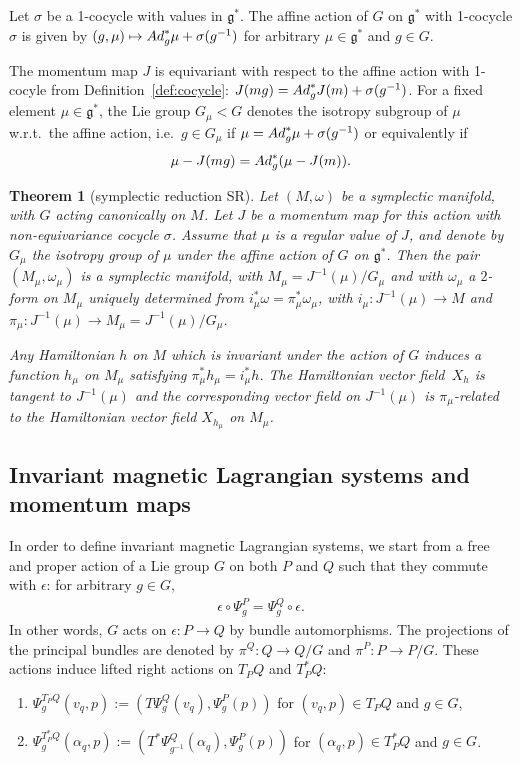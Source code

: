 \documentclass[11pt]{article}
\newtheorem{theorem}{Theorem}
\newcommand{\e}{\epsilon}
\newcommand{\lag}{\mathfrak{g}}
\begin{document}
\begin{definition} Let $\sigma$ be a 1-cocycle with values in $\lag^*$. The af\/f\/ine action of $G$ on $\lag^*$ with 1-cocycle $\sigma$ is given by $(g,\mu)\mapsto {\rm Ad}^*_{g}\mu +\sigma(g^{-1})$ for arbitrary $\mu\in\lag^*$ and $g\in G$.
\end{definition}
The momentum map $J$ is equivariant with respect to the af\/f\/ine action with 1-cocyle from Definition~\ref{def:cocycle}: $J(mg)= {\rm Ad}_g^* J(m)+ \sigma(g^{-1})$. For a f\/ixed element $\mu\in\lag^*$, the Lie group $G_\mu<G$ denotes the isotropy subgroup of $\mu$ w.r.t.\ the af\/f\/ine action, i.e.\ $g\in G_\mu$ if $\mu = {\rm Ad}_{g}^*\mu + \sigma(g^{-1})$ or equivalently if \[\mu - J(mg) = {\rm Ad}_g^*(\mu - J(m)).\]

\begin{theorem}[symplectic reduction SR]\label{thm:mw}
Let $(M,\omega)$ be a symplectic manifold, with $G$ acting canonically on $M$. Let $J$ be a momentum map for this action with non-equivariance cocycle $\sigma$. Assume that $\mu$ is a regular value of $J$, and denote by $G_\mu$ the isotropy group of $\mu$ under the affine action of $G$ on $\lag^*$. Then the pair $(M_\mu,\omega_\mu)$ is a symplectic manifold, with $M_\mu = J^{-1}(\mu)/G_\mu$ and with $\omega_\mu$ a $2$-form on $M_\mu$ uniquely determined from $i^*_\mu \omega=\pi_\mu^*\omega_\mu$, with  $i_\mu:J^{-1}(\mu)\to M$ and $\pi_\mu: J^{-1}(\mu)\to M_\mu=J^{-1}(\mu)/G_\mu$.

Any Hamiltonian $h$ on $M$ which is invariant under the action of $G$ induces a function $h_\mu$ on $M_\mu$ satisfying $\pi_\mu^*h_\mu = i^*_\mu h$. The Hamiltonian vector field~$X_h$ is tangent to $J^{-1}(\mu)$ and the corresponding vector field on $J^{-1}(\mu)$ is $\pi_\mu$-related to the Hamiltonian vector field $X_{h_\mu}$ on $M_\mu$.
\end{theorem}


\subsection{Invariant magnetic Lagrangian systems and momentum maps}\label{section4.2}
In order to def\/ine invariant magnetic Lagrangian systems, we start from a free and proper action of a Lie group $G$ on both $P$ and $Q$ such that they commute with $\e$: for arbitrary $g\in G$,
\begin{gather}\label{compatiblea}\e\circ\Psi^P_g=\Psi^Q_g\circ\e.\end{gather}
In other words, $G$ acts on $\epsilon: P \to Q$ by bundle automorphisms.
The projections of the principal bundles are denoted by $\pi^Q:Q\to Q/G$ and $\pi^P:P\to P/G$.
These actions induce lifted right actions on $T_PQ$ and $T_P^*Q$:
\begin{enumerate}\itemsep=0pt
\item[1)] $\Psi^{T_PQ}_g(v_q,p):= (T\Psi^Q_g(v_q),\Psi^P_g(p))$ for $(v_q,p)\in T_PQ$ and $g\in G$,
\item[2)] $\Psi^{T^*_PQ}_g(\alpha_q,p):= (T^*\Psi^Q_{g^{-1}}(\alpha_q),\Psi^P_g(p))$ for $(\alpha_q,p)\in T^*_PQ$ and $g\in G$.
\end{enumerate}
\end{document}

